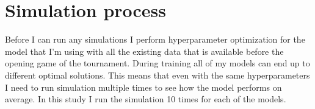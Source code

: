 \section{Simulation process}
Before I can run any simulations I perform hyperparameter optimization for the model that I'm using with all the existing data that is available before the opening game of the tournament. During training all of my models can end up to different optimal solutions. This means that even with the same hyperparameters I need to run simulation multiple times to see how the model performs on average. In this study I run the simulation 10 times for each of the models.